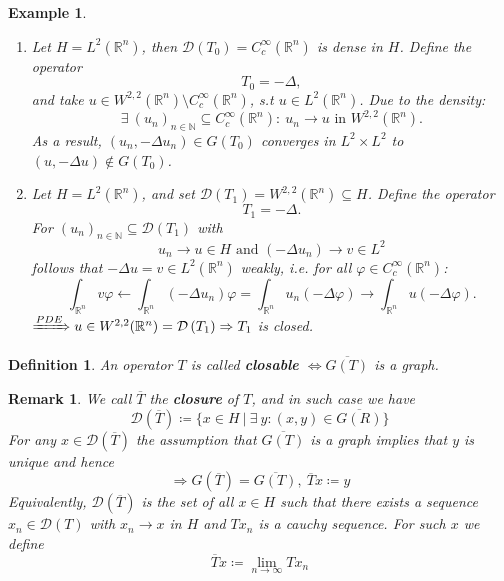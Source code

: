 \documentclass[12pt]{extreport} %
\newcommand{\N}{\mathbb{N}}
\newcommand{\R}{\mathbb{R}}
\newcommand{\DO}[1]{\mathcal{D}\left( {#1} \right)}
\theoremstyle{named}
\theoremstyle{nnamed}
\theoremstyle{itshape}
\newtheorem{definition}{Definition}  \counterwithin{definition}{chapter}
\theoremstyle{normal}
\newtheorem*{example}{Example}
\newtheorem*{remark}{Remark}
\begin{document}
\begin{example} ~\
	\begin{enumerate}
		\item Let $H = L^2(\R^n)$, then $\DO{T_{0}} = C_c^\infty(\R^n)$ is dense in $H$. Define the operator
			$$ T_0 = - \Delta,  $$
			and take $u \in W^{2,2}(\R^n) \setminus C_c^{\infty}(\R^n)$, s.t $u \in L^2(\R^n)$. Due to the density:
			$$ \exists ~(u_n)_{n \in \N} \subseteq C_c^{\infty}(\R^n) \colon ~ u_n \rightarrow u \text{ in } W^{2,2}(\R^n). $$
			As a result, $\left( u_n, -\Delta u_n \right) \in G(T_0)$ converges in $L^2 \times L^2$ to $(u, -\Delta u) \notin G(T_0)$.
		\item Let $H = L^2(\R^n)$, and set $\DO{T_1} = W^{2,2}(\R^n) \subseteq H$. Define the operator
			$$ T_1 = - \Delta. $$
		 For $(u_n)_{n \in \N} \subseteq \DO{T_1}$ with 
			$$ u_n \rightarrow u \in H \text{ and } \left( - \Delta u_n \right) \rightarrow v \in L^2 $$
			follows that $- \Delta u = v \in L^2(\R^n)$ weakly, i.e. for all $\varphi \in C_c^{\infty}(\R^n)$:
			$$ \int_{\R^n} v \varphi \longleftarrow \int_{\R^n} \left( - \Delta u_n \right) \varphi = \int_{\R^n} u_n \left( - \Delta \varphi \right) \longrightarrow \int_{\R^n} u \left( - \Delta \varphi \right). $$
			$\xRightarrow[]{PDE} u \in W^{2,2}(\R^n) = \DO{T_1} \Rightarrow T_1$ is closed.
	\end{enumerate}
\end{example}

 
\begin{definition}
	An operator $T$ is called \textbf{closable} $\iff \overline{G(T)}$ is a graph.
\end{definition}

 
\begin{remark}
	We call $\overline{T}$ the \textbf{closure} of $T$, and in such case we have 
	$$ \DO{\overline{T}} \coloneqq \big\{ x \in H ~ \big| ~ \exists ~ y \colon (x, y) \in \overline{G(R)} \big\} $$	
	For any $x \in \DO{\overline{T}}$ the assumption that $\overline{G(T)}$ is a graph implies that $y$ is unique and hence
	$$ \Rightarrow G(\overline{T}) = \overline{G(T)}, ~\overline{T} x \coloneqq y $$
	Equivalently, $\DO{\overline{T}}$ is the set of all $x \in H$ such that there exists a sequence $x_n \in \DO{T}$ with $x_n \rightarrow x$ in $H$ and $T x_n$ is a cauchy sequence. For such $x$ we define
	$$ \overline{T}x \coloneqq \lim_{n \rightarrow \infty} T x_n $$
\end{remark}
\end{document}
